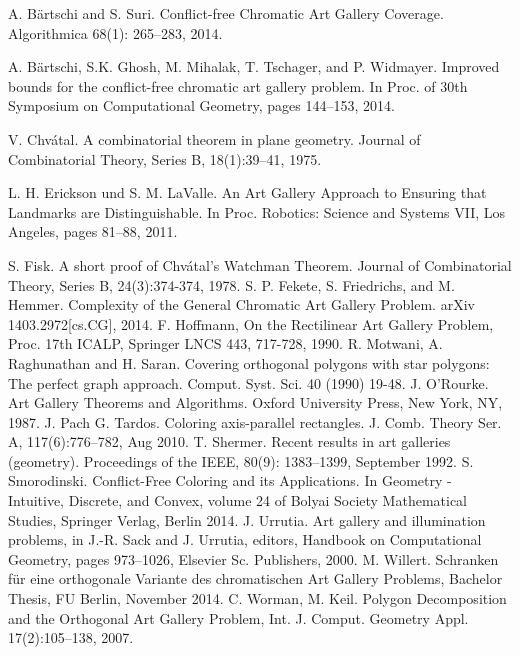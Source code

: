 \documentclass[a4paper,USenglish,numberwithinsect]{lipics}
\theoremstyle{plain}
\begin{document}
\begin{thebibliography}{999}


 A. B\"artschi and S. Suri. Conflict-free Chromatic Art Gallery Coverage. Algorithmica 68(1): 265--283, 2014.

 A. B\"artschi, S.K. Ghosh, M. Mihalak, T. Tschager, and P. Widmayer. 
Improved bounds for the conflict-free chromatic art gallery problem. In Proc. of 30th Symposium on Computational Geometry, pages 144--153, 2014.

 V. Chv\'atal. A combinatorial theorem in plane geometry. Journal of Combinatorial Theory, Series B, 18(1):39--41, 1975.

 L. H. Erickson und S. M. LaValle. An Art Gallery Approach to Ensuring that Landmarks are Distinguishable. In Proc. Robotics: Science and Systems VII, Los Angeles, pages 81--88, 2011.



 S. Fisk. A short proof of Chv\'atal's Watchman Theorem. Journal of Combinatorial Theory, Series B, 24(3):374-374, 1978.
 S. P. Fekete, S. Friedrichs, and M. Hemmer. Complexity of the General Chromatic Art Gallery Problem. arXiv 1403.2972[cs.CG], 2014.
F. Hoffmann, On the Rectilinear Art Gallery Problem, Proc. 17th ICALP, Springer LNCS 443,  717-728, 1990. 
 R. Motwani, A. Raghunathan and H. Saran. Covering orthogonal polygons with star polygons: The perfect graph approach. Comput. Syst. Sci. 40 (1990) 19-48.
 J. O'Rourke. Art Gallery Theorems and Algorithms. Oxford University Press, New York, NY, 1987.
 J. Pach G. Tardos. Coloring axis-parallel rectangles. J. Comb. Theory Ser. A, 117(6):776--782, Aug 2010.
 T. Shermer. Recent results in art galleries (geometry). Proceedings of the IEEE, 80(9): 1383--1399, September 1992.
 S. Smorodinski. Conflict-Free Coloring and its Applications. In Geometry - Intuitive, Discrete, and Convex, volume 24 of Bolyai Society Mathematical Studies, Springer Verlag, Berlin 2014.
 J. Urrutia. Art gallery and illumination problems, in J.-R. Sack and J. Urrutia, editors, Handbook on Computational Geometry, pages 973--1026, Elsevier Sc. Publishers, 2000.
 M. Willert. Schranken für eine orthogonale Variante des chromatischen Art Gallery Problems, Bachelor Thesis, FU Berlin, November 2014.
 C. Worman, M. Keil. Polygon Decomposition and the Orthogonal Art Gallery Problem, Int. J. Comput. Geometry Appl. 17(2):105--138, 2007.
\end{thebibliography}
\end{document}
